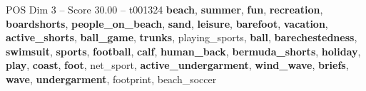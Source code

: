 \begin{textsample}{POS Dim 3 – Score 30.00 – t001324}  \label{ex:f3_pos_006}
\textbf{beach}, \textbf{summer}, \textbf{fun}, \textbf{recreation}, \textbf{boardshorts}, \textbf{people\_on\_beach}, \textbf{sand}, \textbf{leisure}, \textbf{barefoot}, \textbf{vacation}, \textbf{active\_shorts}, \textbf{ball\_game}, \textbf{trunks}, playing\_sports, \textbf{ball}, \textbf{barechestedness}, \textbf{swimsuit}, \textbf{sports}, \textbf{football}, \textbf{calf}, \textbf{human\_back}, \textbf{bermuda\_shorts}, \textbf{holiday}, \textbf{play}, \textbf{coast}, \textbf{foot}, net\_sport, \textbf{active\_undergarment}, \textbf{wind\_wave}, \textbf{briefs}, \textbf{wave}, \textbf{undergarment}, footprint, beach\_soccer

\end{textsample}
